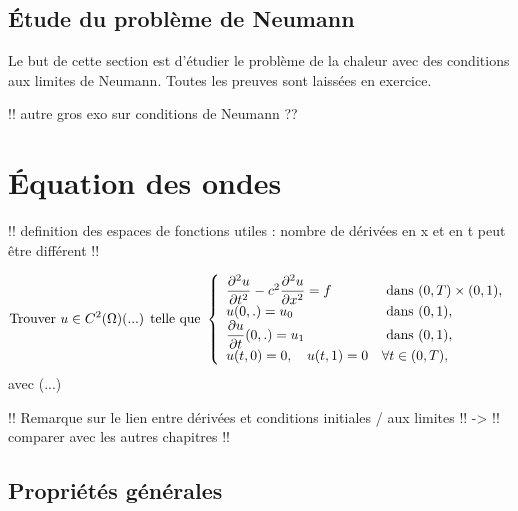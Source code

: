 \documentclass[12pt,a4paper,twoside]{article}
\begin{document}
\subsection{\'Etude du probl\`eme de Neumann}

Le but de cette section est d'\'etudier le probl\`eme de la chaleur
avec des conditions aux limites de Neumann.
Toutes les preuves sont laiss\'ees en exercice.

!! autre gros exo sur conditions de Neumann ??

\section{\'Equation des ondes}

!! definition des espaces de fonctions utiles : nombre de d\'eriv\'ees en x et en t
peut \^etre diff\'erent !!

\begin{equation}
  \label{eq:ondes_Dir}
  \text{Trouver $u \in C^2(\Omega)$(...) telle que  }
  \left\{
    \begin{array}{l l}
      \dfrac{\partial^2 u}{\partial t^2} - c^2 \dfrac{\partial^2 u}{\partial x^2} = f 
      &\text{ dans } (0,T) \times (0,1) ,
      \\
      u(0,.) = u_0 
      & \text{ dans } (0,1) ,
      \\
      \dfrac{\partial u}{\partial t}(0,.) = u_1 
      & \text{ dans } (0,1) ,
      \\
      u(t,0) = 0 , \quad u(t,1) = 0 & \forall t \in (0,T) ,
    \end{array}
  \right.
\end{equation}
avec (...)


!! Remarque sur le lien entre d\'eriv\'ees et conditions initiales / aux limites !!
-> !! comparer avec les autres chapitres !!

\subsection{Propri\'et\'es g\'en\'erales}

\end{document}
